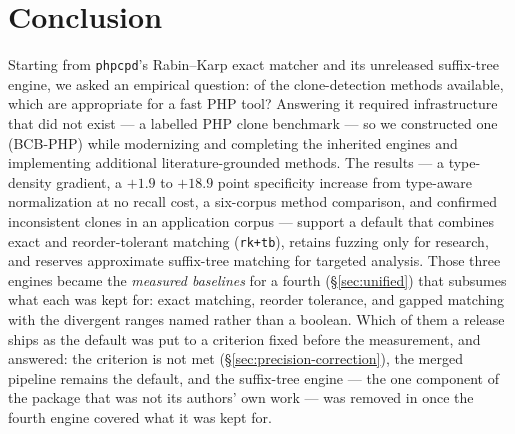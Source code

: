 \documentclass[10pt,a4paper]{article}
\newcounter{prop}[section]
\newcounter{lem}[section]
\begin{document}
\section{Conclusion}
Starting from \texttt{phpcpd}'s Rabin--Karp exact matcher and its unreleased suffix-tree engine, we
asked an empirical question: of the clone-detection methods available, which are appropriate for a fast
PHP tool? Answering it required infrastructure that did not exist --- a labelled PHP clone benchmark ---
so we constructed one (BCB-PHP) while modernizing and completing the inherited engines and implementing
additional literature-grounded methods. The results --- a type-density gradient, a $+1.9$ to $+18.9$
point specificity increase from type-aware normalization at no recall cost, a six-corpus method
comparison, and confirmed inconsistent clones in an application corpus --- support a default that
combines exact and reorder-tolerant matching (\texttt{rk+tb}), retains fuzzing only for research, and
reserves approximate suffix-tree matching for targeted analysis. Those three engines became
the \emph{measured baselines} for a fourth (\S\ref{sec:unified}) that subsumes what each was kept for:
exact matching, reorder tolerance, and gapped matching with the divergent ranges named rather than a
boolean. Which of them a release ships as the default was put to a criterion fixed before the
measurement, and answered: the criterion is not met
(\S\ref{sec:precision-correction}), the merged pipeline remains the default, and the suffix-tree
engine --- the one component of the package that was not its authors' own work --- was removed in
\factCodeRelease{} once the fourth engine covered what it was kept for.
\end{document}

